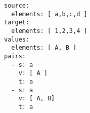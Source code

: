 \par\begin{minipage}{60ex}
\begin{verbatim}
source:
  elements: [ a,b,c,d ]
target:
  elements: [ 1,2,3,4 ]
values:
  elements: [ A, B ]
pairs:
  - s: a
    v: [ A ]
    t: a
  - s: a
    v: [ A, B]
    t: a

\end{verbatim}
\end{minipage}\par